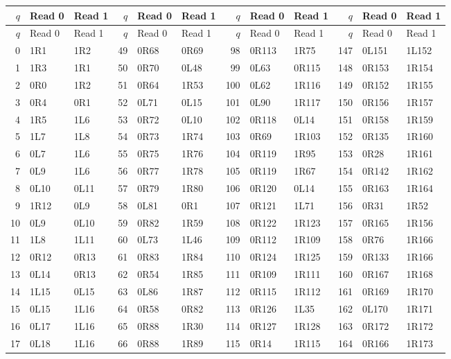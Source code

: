 \begingroup\footnotesize\setlength{\tabcolsep}{5pt}
\begin{longtable}{@{}rllrllrllrll@{}}
\toprule $q$ & Read 0 & Read 1 & $q$ & Read 0 & Read 1 & $q$ & Read 0 & Read 1 & $q$ & Read 0 & Read 1\\\midrule\endfirsthead
\toprule $q$ & Read 0 & Read 1 & $q$ & Read 0 & Read 1 & $q$ & Read 0 & Read 1 & $q$ & Read 0 & Read 1\\\midrule\endhead
0 & 1R1 & 1R2 & 49 & 0R68 & 0R69 & 98 & 0R113 & 1R75 & 147 & 0L151 & 1L152\\
1 & 1R3 & 1R1 & 50 & 0R70 & 0L48 & 99 & 0L63 & 0R115 & 148 & 0R153 & 1R154\\
2 & 0R0 & 1R2 & 51 & 0R64 & 1R53 & 100 & 0L62 & 1R116 & 149 & 0R152 & 1R155\\
3 & 0R4 & 0R1 & 52 & 0L71 & 0L15 & 101 & 0L90 & 1R117 & 150 & 0R156 & 1R157\\
4 & 1R5 & 1L6 & 53 & 0R72 & 0L10 & 102 & 0R118 & 0L14 & 151 & 0R158 & 1R159\\
5 & 1L7 & 1L8 & 54 & 0R73 & 1R74 & 103 & 0R69 & 1R103 & 152 & 0R135 & 1R160\\
6 & 0L7 & 1L6 & 55 & 0R75 & 1R76 & 104 & 0R119 & 1R95 & 153 & 0R28 & 1R161\\
7 & 0L9 & 1L6 & 56 & 0R77 & 1R78 & 105 & 0R119 & 1R67 & 154 & 0R142 & 1R162\\
8 & 0L10 & 0L11 & 57 & 0R79 & 1R80 & 106 & 0R120 & 0L14 & 155 & 0R163 & 1R164\\
9 & 1R12 & 0L9 & 58 & 0L81 & 0R1 & 107 & 0R121 & 1L71 & 156 & 0R31 & 1R52\\
10 & 0L9 & 0L10 & 59 & 0R82 & 1R59 & 108 & 0R122 & 1R123 & 157 & 0R165 & 1R156\\
11 & 1L8 & 1L11 & 60 & 0L73 & 1L46 & 109 & 0R112 & 1R109 & 158 & 0R76 & 1R166\\
12 & 0R12 & 0R13 & 61 & 0R83 & 1R84 & 110 & 0R124 & 1R125 & 159 & 0R133 & 1R166\\
13 & 0L14 & 0R13 & 62 & 0R54 & 1R85 & 111 & 0R109 & 1R111 & 160 & 0R167 & 1R168\\
14 & 1L15 & 0L15 & 63 & 0L86 & 1R87 & 112 & 0R115 & 1R112 & 161 & 0R169 & 1R170\\
15 & 0L15 & 1L16 & 64 & 0R58 & 0R82 & 113 & 0R126 & 1L35 & 162 & 0L170 & 1R171\\
16 & 0L17 & 1L16 & 65 & 0R88 & 1R30 & 114 & 0R127 & 1R128 & 163 & 0R172 & 1R172\\
17 & 0L18 & 1L16 & 66 & 0R88 & 1R89 & 115 & 0R14 & 1R115 & 164 & 0R166 & 1R173\\

\end{longtable}
